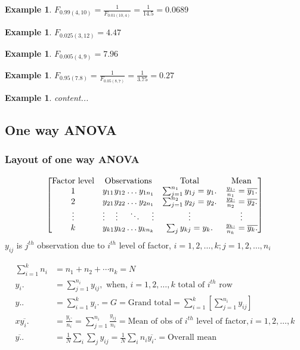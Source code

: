 \documentclass[oneside,11pt,pdftex]{book}%
\numberwithin{equation}{section}
\newtheorem{example}[theorem]{Example}
\numberwithin{section}{chapter}
\numberwithin{equation}{chapter}
\begin{document}
\begin{example}
	$ F_{0.99 (4,10)} = \frac{1}{F_{0.01 (10,4)}}=\frac{1}{14.5}=0.0689$
\end{example}

\begin{example}
	$ F_{0.025(3,12)}=4.47 $
\end{example}
\begin{example}
	$ F_{0.005 (4,9)}=7.96$
\end{example}
\begin{example}
	$ F_{0.95 (7.8)} = \frac{1}{F_{0.05 (8,7)}}=\frac{1}{3.75}=0.27$
\end{example}
\begin{example}
	content...
\end{example}
\subsection{One way ANOVA}
\subsubsection{Layout of one way ANOVA}
\[
\begin{bmatrix} 
	\text{Factor level} & \text{Observations} & \text{Total} & \text{Mean} \\
	1 & y_{11} \hfill y_{12} \hfill \dots \hfill y_{1n_1} & \sum_{j=1}^{n_1}y_{1j}=y_1. & \frac{y_1.}{n_1}=\overline{y_{1}.}\\
	2 & y_{21} \hfill y_{22} \hfill \dots \hfill y_{2n_1} & \sum_{j=1}^{n_2}y_{2j}=y_2. & \frac{y_2.}{n_2}=\overline{y_{2}.}\\
	\vdots & \vdots \hfill \vdots \hfill \ddots \hfill \vdots & \vdots & \vdots \\
	k & y_{k1} \hfill y_{k2} \hfill \dots \hfill y_{kn_{k}} & \sum_j y_{kj}=y_k. & \frac{y_k .}{n_k}=\overline{y_{k}.}
\end{bmatrix}
\]
$ y_{ij} $ is $ j^{th} $ observation due to $ i^{th} $ level of factor, $ i=1,2,\dots, k; j=1,2,\dots,n_i $

\begin{align*}
	\sum_{i=1}^k n_i&=n_1+n_2+\cdots n_k = N\\
	y_i.&= \sum_{j=1}^{n_i} y_{ij}, \text{ when, } i=1,2,\dots,k \text{ total of $i^{th}$ row}\\
	y..&= \sum_{i=1}^{k} y_i. = G = \text{Grand total}= \sum_{i=1}^k \left[ \sum_{j=1}^{n_i} y_{ij} \right]\\
	x \overline{y_i.}&= \frac{y_i.}{n_i}=\sum_{j=1}^{n_i}\frac{y_{ij}}{n_i}= \text{Mean of obs of $i^{th}$ level of factor}, i=1,2, \dots, k\\
	\overline{y..}&=\frac{1}{N}\sum_i \sum_j y_{ij}=\frac{1}{N} \sum_i n_i \overline{y_i.}=\text{Overall mean}
\end{align*}
\end{document}
